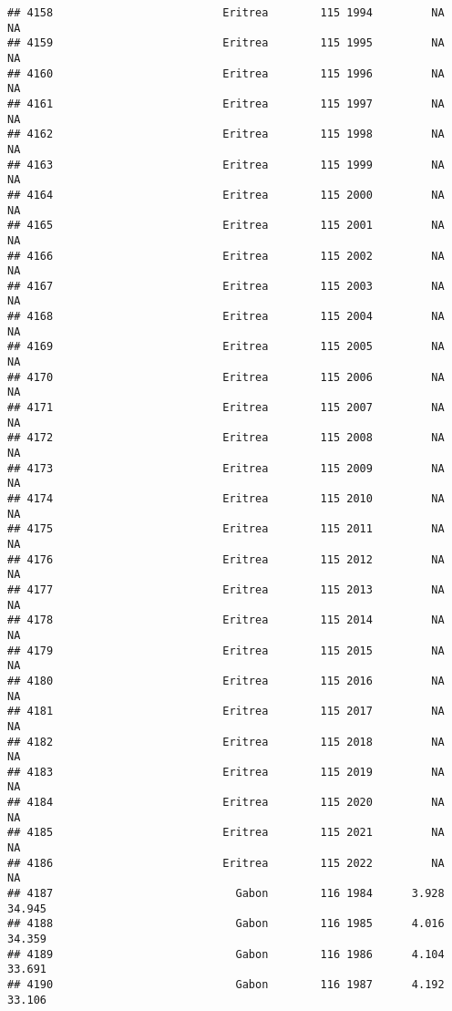\documentclass[
]{article}
\begin{document}
\begin{verbatim}
## 4158                          Eritrea        115 1994         NA         NA
## 4159                          Eritrea        115 1995         NA         NA
## 4160                          Eritrea        115 1996         NA         NA
## 4161                          Eritrea        115 1997         NA         NA
## 4162                          Eritrea        115 1998         NA         NA
## 4163                          Eritrea        115 1999         NA         NA
## 4164                          Eritrea        115 2000         NA         NA
## 4165                          Eritrea        115 2001         NA         NA
## 4166                          Eritrea        115 2002         NA         NA
## 4167                          Eritrea        115 2003         NA         NA
## 4168                          Eritrea        115 2004         NA         NA
## 4169                          Eritrea        115 2005         NA         NA
## 4170                          Eritrea        115 2006         NA         NA
## 4171                          Eritrea        115 2007         NA         NA
## 4172                          Eritrea        115 2008         NA         NA
## 4173                          Eritrea        115 2009         NA         NA
## 4174                          Eritrea        115 2010         NA         NA
## 4175                          Eritrea        115 2011         NA         NA
## 4176                          Eritrea        115 2012         NA         NA
## 4177                          Eritrea        115 2013         NA         NA
## 4178                          Eritrea        115 2014         NA         NA
## 4179                          Eritrea        115 2015         NA         NA
## 4180                          Eritrea        115 2016         NA         NA
## 4181                          Eritrea        115 2017         NA         NA
## 4182                          Eritrea        115 2018         NA         NA
## 4183                          Eritrea        115 2019         NA         NA
## 4184                          Eritrea        115 2020         NA         NA
## 4185                          Eritrea        115 2021         NA         NA
## 4186                          Eritrea        115 2022         NA         NA
## 4187                            Gabon        116 1984      3.928     34.945
## 4188                            Gabon        116 1985      4.016     34.359
## 4189                            Gabon        116 1986      4.104     33.691
## 4190                            Gabon        116 1987      4.192     33.106

\end{verbatim}
\end{document}
